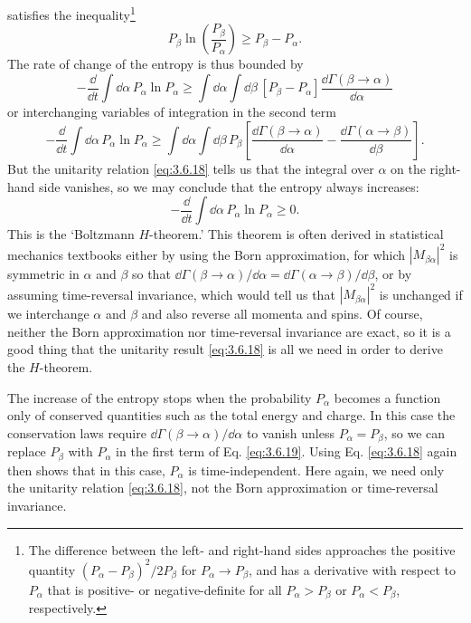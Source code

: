 
satisfies the inequality\footnote{The difference between the left- and
right-hand sides approaches the positive quantity
$(P_\alpha-P_\beta)^2/2P_\beta$ for $P_\alpha\to P_\beta$, and has a
derivative with respect to $P_\alpha$ that is positive- or negative-definite
for all $P_\alpha>P_\beta$ or $P_\alpha<P_\beta$, respectively.}
\[
  P_\beta\ln\!\left(\frac{P_\beta}{P_\alpha}\right)
  \geq P_\beta-P_\alpha.
\]
The rate of change of the entropy is thus bounded by
\[
  -\frac{\dd}{\dd t}\int \dd\alpha\,P_\alpha\ln P_\alpha
  \geq \int \dd\alpha\int \dd\beta\,[P_\beta-P_\alpha]
  \frac{\dd\Gamma(\beta\to\alpha)}{\dd\alpha}
\]
or interchanging variables of integration in the second term
\[
  -\frac{\dd}{\dd t}\int \dd\alpha\,P_\alpha\ln P_\alpha
  \geq \int \dd\alpha\int \dd\beta\,P_\beta
  \left[
    \frac{\dd\Gamma(\beta\to\alpha)}{\dd\alpha}
    -\frac{\dd\Gamma(\alpha\to\beta)}{\dd\beta}
  \right].
\]
But the unitarity relation \eqref{eq:3.6.18} tells us that the integral over $\alpha$
on the right-hand side vanishes, so we may conclude that the entropy always
increases:
\begin{equation}
  -\frac{\dd}{\dd t}\int \dd\alpha\,P_\alpha\ln P_\alpha\geq0.
  \tag{3.6.20}\label{eq:3.6.20}
\end{equation}
This is the `Boltzmann $H$-theorem.' This theorem is often derived in
statistical mechanics textbooks either by using the Born approximation, for
which $|M_{\beta\alpha}|^2$ is symmetric in $\alpha$ and $\beta$ so that
$\dd\Gamma(\beta\to\alpha)/\dd\alpha=\dd\Gamma(\alpha\to\beta)/\dd\beta$, or by
assuming time-reversal invariance, which would tell us that
$|M_{\beta\alpha}|^2$ is unchanged if we interchange $\alpha$ and $\beta$ and
also reverse all momenta and spins. Of course, neither the Born approximation
nor time-reversal invariance are exact, so it is a good thing that the
unitarity result \eqref{eq:3.6.18} is all we need in order to derive the $H$-theorem.

The increase of the entropy stops when the probability $P_\alpha$ becomes a
function only of conserved quantities such as the total energy and charge. In
this case the conservation laws require $\dd\Gamma(\beta\to\alpha)/\dd\alpha$ to
vanish unless $P_\alpha=P_\beta$, so we can replace $P_\beta$ with $P_\alpha$
in the first term of Eq. \eqref{eq:3.6.19}. Using Eq. \eqref{eq:3.6.18} again then shows that in
this case, $P_\alpha$ is time-independent. Here again, we need only the
unitarity relation \eqref{eq:3.6.18}, not the Born approximation or time-reversal
invariance.

